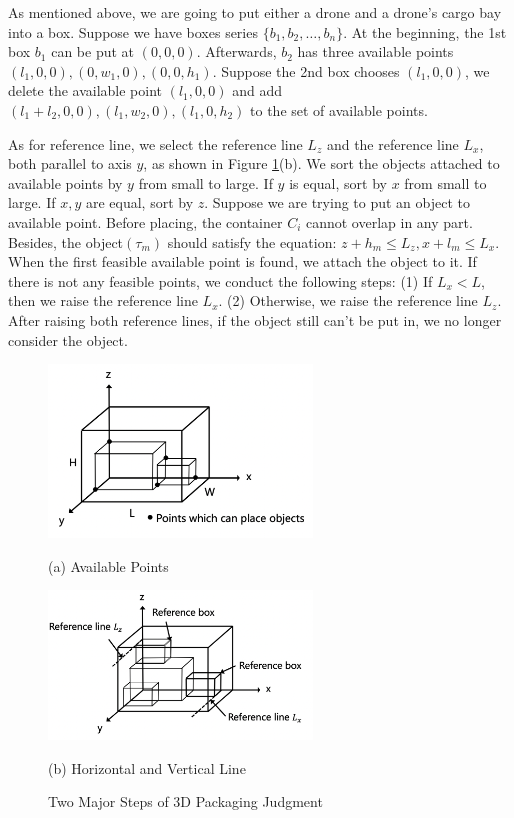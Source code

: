 \documentclass{mcmthesis}
\begin{document}
\noindent As mentioned above, we are going to put either a drone and a drone's cargo bay into a box. Suppose we have boxes series $\{b_1,b_2,\dots,b_n\}$. At the beginning, the 1st box $b_1$ can be put at $(0,0,0)$. Afterwards, $b_2$ has three available points $(l_1,0,0),(0,w_1,0),(0,0,h_1)$. Suppose the 2nd box chooses $(l_1,0,0)$, we delete the available point $(l_1,0,0)$ and add $(l_1+l_2,0,0),(l_1,w_2,0),(l_1,0,h_2)$ to the set of available points.

\noindent As for reference line, we select the reference line $L_z$ and the reference line $L_x$, both parallel to axis $y$, as shown in Figure \ref{Fig:pack}(b). We sort the objects attached to available points by $y$ from small to large. If $y$ is equal, sort by $x$ from small to large. If $x,y$ are equal, sort by $z$. Suppose we are trying to put an object to available point. Before placing, the container $C_i$ cannot overlap in any part. Besides, the object$(\tau_m)$ should satisfy the equation: $z+h_m\leq L_z, x+l_m\leq L_x$. When the first feasible available point is found, we attach the object to it. If there is not any feasible points, we conduct the following steps: (1) If $L_x< L$, then we raise the reference line $L_x$. (2) Otherwise, we raise the reference line $L_z$. After raising both reference lines, if the object still can't be put in, we no longer consider the object.

\begin{figure}[htb]
    \begin{minipage}{0.48\linewidth}
    \centerline{\includegraphics[width=7.0cm]{figures/availablepoints2.png}}
    \centerline{(a) Available Points}
    \end{minipage}
    \begin{minipage}{0.48\linewidth}
    \centerline{\includegraphics[width=7cm]{figures/referenceline.png}}
    \centerline{(b) Horizontal and Vertical Line}
    \end{minipage}
    \caption{Two Major Steps of 3D Packaging Judgment}
    \label{Fig:pack}
\end{figure}
\end{document}
